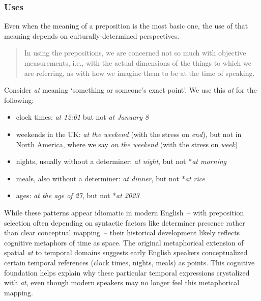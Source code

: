 \subsubsection*{Uses}

Even when the meaning of a preposition is the most basic one, the use of that
meaning depends on culturally-determined perspectives.

\begin{quote}
    In using the prepositions, we are concerned not so much with objective measurements, i.e., with the actual dimensions of the things to
    which we are referring, as with how we imagine them to be at the
    time of speaking. \citep{close1992}
\end{quote}

Consider \textit{at} meaning `something or someone's exact point'. We use this \textit{at} for
the following:

\begin{itemize}
    \item clock times: \textit{at 12:01} but not \textit{at January 8}
    \item weekends in the UK: \textit{at the weekend} (with the stress on \textit{end}), but not in
    North America, where we say \textit{on the weekend} (with the stress on \textit{week})
    \item nights, usually without a determiner: \textit{at night}, but not *\textit{at morning}
    \item meals, also without a determiner: \textit{at dinner}, but not *\textit{at rice}
    \item ages: \textit{at the age of 27}, but not *\textit{at 2023}
\end{itemize}
While these patterns appear idiomatic in modern English~-- with preposition selection often depending on syntactic factors like determiner presence rather than clear conceptual mapping~-- their historical development likely reflects cognitive metaphors of time as space. The original metaphorical extension of spatial \textit{at} to temporal domains suggests early English speakers conceptualized certain temporal references (clock times, nights, meals) as points. This cognitive foundation helps explain why these particular temporal expressions crystalized with \textit{at}, even though modern speakers may no longer feel this metaphorical mapping.

